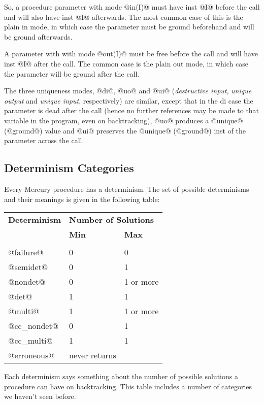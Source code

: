 So, a procedure parameter with mode @in(I)@ must have inst @I@
before the call and will also have inst @I@ afterwards.  The
most common case of this is the plain in mode, in which
case the parameter must be ground beforehand and will be
ground afterwards.

A parameter with with mode @out(I)@ must be free before the
call and will have inst @I@ after the call.  The common case
is the plain out mode, in which case the parameter will
be ground after the call.

The three uniqueness modes, @di@, @uo@ and @ui@ (\emph{destructive
input}, \emph{unique output} and \emph{unique input}, respectively)
are similar, except that in the di case the parameter is
dead after the call (hence no further references may be
made to that variable in the program, even on
backtracking), @uo@ produces a @unique@ (@ground@) value and @ui@
preserves the @unique@ (@ground@) inst of the parameter across
the call.

\subsection{Determinism Categories}

Every Mercury procedure has a determinism.  The set of
possible determinisms and their meanings is given in the
following table:

\begin{tabular}{lll}
\textbf{Determinism} & \multicolumn{2}{l}{\textbf{Number of Solutions}} \\
                     & \textbf{Min} & \textbf{Max} \\
\hline \\
@failure@            & 0            & 0 \\
@semidet@            & 0            & 1 \\
@nondet@             & 0            & 1 or more \\
@det@                & 1            & 1 \\
@multi@              & 1            & 1 or more \\
@cc_nondet@          & 0            & 1 \\
@cc_multi@           & 1            & 1 \\
@erroneous@          & never returns \\
\end{tabular}

Each determinism says something about the number of possible
solutions a procedure can have on backtracking.  This table
includes a number of categories we haven't seen before.

